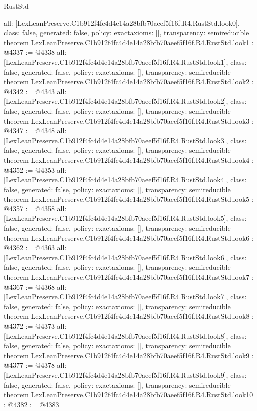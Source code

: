 \begin{lexlean}{RustStd}
\begin{coremodule}
{  all: [LexLeanPreserve.C1b912f4fc4d4e14a28bfb70aeef5f16f.R4.RustStd.look0],
  class: false,
  generated: false,
  policy: exact{axioms: []},
  transparency: semireducible
}
theorem LexLeanPreserve.C1b912f4fc4d4e14a28bfb70aeef5f16f.R4.RustStd.look1 : @4337 := @4338 {
  all: [LexLeanPreserve.C1b912f4fc4d4e14a28bfb70aeef5f16f.R4.RustStd.look1],
  class: false,
  generated: false,
  policy: exact{axioms: []},
  transparency: semireducible
}
theorem LexLeanPreserve.C1b912f4fc4d4e14a28bfb70aeef5f16f.R4.RustStd.look2 : @4342 := @4343 {
  all: [LexLeanPreserve.C1b912f4fc4d4e14a28bfb70aeef5f16f.R4.RustStd.look2],
  class: false,
  generated: false,
  policy: exact{axioms: []},
  transparency: semireducible
}
theorem LexLeanPreserve.C1b912f4fc4d4e14a28bfb70aeef5f16f.R4.RustStd.look3 : @4347 := @4348 {
  all: [LexLeanPreserve.C1b912f4fc4d4e14a28bfb70aeef5f16f.R4.RustStd.look3],
  class: false,
  generated: false,
  policy: exact{axioms: []},
  transparency: semireducible
}
theorem LexLeanPreserve.C1b912f4fc4d4e14a28bfb70aeef5f16f.R4.RustStd.look4 : @4352 := @4353 {
  all: [LexLeanPreserve.C1b912f4fc4d4e14a28bfb70aeef5f16f.R4.RustStd.look4],
  class: false,
  generated: false,
  policy: exact{axioms: []},
  transparency: semireducible
}
theorem LexLeanPreserve.C1b912f4fc4d4e14a28bfb70aeef5f16f.R4.RustStd.look5 : @4357 := @4358 {
  all: [LexLeanPreserve.C1b912f4fc4d4e14a28bfb70aeef5f16f.R4.RustStd.look5],
  class: false,
  generated: false,
  policy: exact{axioms: []},
  transparency: semireducible
}
theorem LexLeanPreserve.C1b912f4fc4d4e14a28bfb70aeef5f16f.R4.RustStd.look6 : @4362 := @4363 {
  all: [LexLeanPreserve.C1b912f4fc4d4e14a28bfb70aeef5f16f.R4.RustStd.look6],
  class: false,
  generated: false,
  policy: exact{axioms: []},
  transparency: semireducible
}
theorem LexLeanPreserve.C1b912f4fc4d4e14a28bfb70aeef5f16f.R4.RustStd.look7 : @4367 := @4368 {
  all: [LexLeanPreserve.C1b912f4fc4d4e14a28bfb70aeef5f16f.R4.RustStd.look7],
  class: false,
  generated: false,
  policy: exact{axioms: []},
  transparency: semireducible
}
theorem LexLeanPreserve.C1b912f4fc4d4e14a28bfb70aeef5f16f.R4.RustStd.look8 : @4372 := @4373 {
  all: [LexLeanPreserve.C1b912f4fc4d4e14a28bfb70aeef5f16f.R4.RustStd.look8],
  class: false,
  generated: false,
  policy: exact{axioms: []},
  transparency: semireducible
}
theorem LexLeanPreserve.C1b912f4fc4d4e14a28bfb70aeef5f16f.R4.RustStd.look9 : @4377 := @4378 {
  all: [LexLeanPreserve.C1b912f4fc4d4e14a28bfb70aeef5f16f.R4.RustStd.look9],
  class: false,
  generated: false,
  policy: exact{axioms: []},
  transparency: semireducible
}
theorem LexLeanPreserve.C1b912f4fc4d4e14a28bfb70aeef5f16f.R4.RustStd.look10 : @4382 := @4383 {
}
\end{coremodule}
\end{lexlean}
